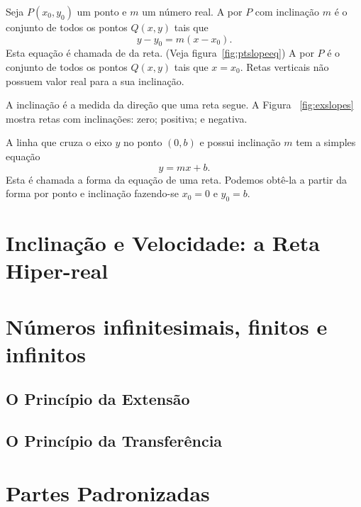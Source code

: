 \documentclass{svmono}
\begin{document}
\begin{defin}
Seja $P(x_0,y_0)$ um ponto e $m$ um número real. A  por $P$
com inclinação $m$ é o conjunto de todos os pontos $Q(x,y)$ tais que
\[
  y - y_0 = m(x - x_0).
\]
Esta equação é chamada de  %
%
da reta.
(Veja figura~\ref{fig:ptslopeeq})
A  por $P$ é o conjunto de todos os
pontos $Q(x,y)$ tais que $x = x_0$. Retas verticais não possuem valor
real para a sua inclinação.
\end{defin}

A inclinação é a medida da direção que uma reta segue. A Figura%
~\ref{fig:exslopes} mostra retas com inclinações: zero; positiva;
e negativa.

A linha que cruza o eixo $y$ no ponto $(0,b)$ e possui inclinação $m$
tem a simples equação
\[
  y = mx + b.
\]
Esta é chamada a forma %
%
da equação de uma reta. Podemos obtê-la a partir da forma por
ponto e inclinação fazendo-se $x_0 = 0$ e $y_0 = b$.

\section{Inclinação e Velocidade: a Reta Hiper-real}
\label{sec:hyperrealline}

\section{Números infinitesimais, finitos e infinitos}
\label{sec:infnumbers}

\subsection{O Princípio da Extensão}
\label{sec:extprinciple}

\subsection{O Princípio da Transferência}
\label{sec:transferprinciple}

\section{Partes Padronizadas}
\label{sec:standardparts}
\end{document}
